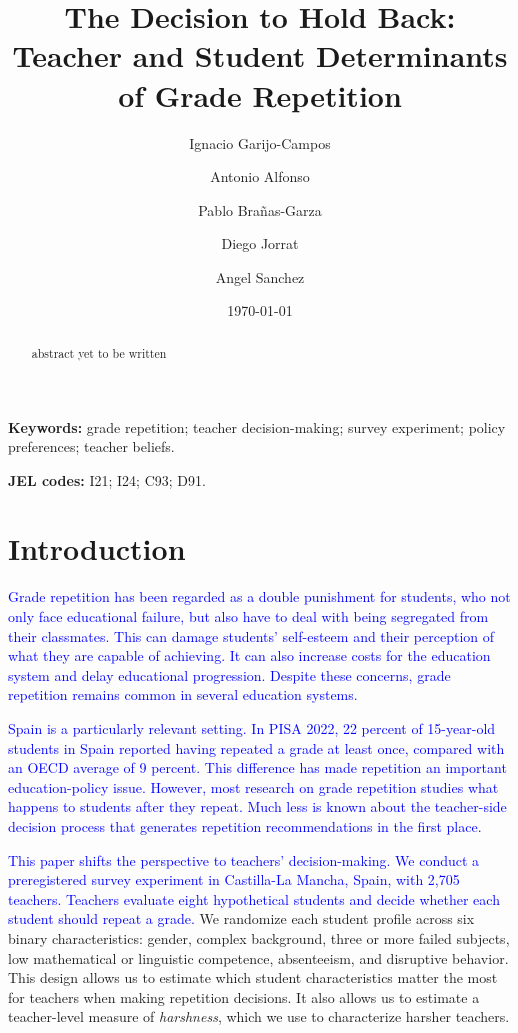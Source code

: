 \documentclass[12pt,a4paper]{article}
\title{The Decision to Hold Back: Teacher and Student Determinants of Grade Repetition}
\author{Ignacio Garijo-Campos \and Antonio Alfonso \and Pablo Bra\~nas-Garza \and Diego Jorrat \and Angel Sanchez}
\date{\today}
\begin{document}
\maketitle

\begin{abstract}
\noindent abstract yet to be written
\end{abstract}

\noindent\textbf{Keywords:} grade repetition; teacher decision-making; survey experiment; policy preferences; teacher beliefs.

\noindent\textbf{JEL codes:} I21; I24; C93; D91.

\section{Introduction}

\textcolor{blue}{Grade repetition has been regarded as a double punishment for students, who not only face educational failure, but also have to deal with being segregated from their classmates. This can damage students' self-esteem and their perception of what they are capable of achieving. It can also increase costs for the education system and delay educational progression. Despite these concerns, grade repetition remains common in several education systems.}

\textcolor{blue}{Spain is a particularly relevant setting. In PISA 2022, 22 percent of 15-year-old students in Spain reported having repeated a grade at least once, compared with an OECD average of 9 percent. This difference has made repetition an important education-policy issue. However, most research on grade repetition studies what happens to students after they repeat. Much less is known about the teacher-side decision process that generates repetition recommendations in the first place.}

\textcolor{blue}{This paper shifts the perspective to teachers' decision-making. We conduct a preregistered survey experiment in Castilla-La Mancha, Spain, with 2,705 teachers. Teachers evaluate eight hypothetical students and decide whether each student should repeat a grade.} We randomize each student profile across six binary characteristics: gender, complex background, three or more failed subjects, low mathematical or linguistic competence, absenteeism, and disruptive behavior. This design allows us to estimate which student characteristics matter the most for teachers when making repetition decisions. It also allows us to estimate a teacher-level measure of \textit{harshness}, which we use to characterize harsher teachers.
\end{document}
